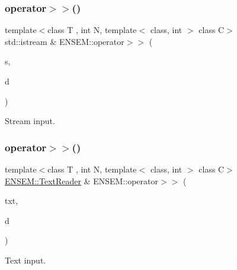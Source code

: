 \subsubsection{\texorpdfstring{operator$>$$>$()}{operator>>()}\hspace{0.1cm}{\footnotesize\ttfamily [1/2]}}
{\footnotesize\ttfamily template$<$class T , int N, template$<$ class, int $>$ class C$>$ \\
std\+::istream \& E\+N\+S\+E\+M\+::operator$>$$>$ (\begin{DoxyParamCaption}\item[{std\+::istream \&}]{s,  }\item[{\mbox{\hyperlink{classENSEM_1_1PVector}{P\+Vector}}$<$ T, \mbox{\hyperlink{operator__name__util_8cc_a7722c8ecbb62d99aee7ce68b1752f337}{N}}, C $>$ \&}]{d }\end{DoxyParamCaption})\hspace{0.3cm}{\ttfamily [inline]}}



Stream input. 

\mbox{\label{group__primvector_gae8999766af04f54e1142ab8717a7f742}} 
\subsubsection{\texorpdfstring{operator$>$$>$()}{operator>>()}\hspace{0.1cm}{\footnotesize\ttfamily [2/2]}}
{\footnotesize\ttfamily template$<$class T , int N, template$<$ class, int $>$ class C$>$ \\
\mbox{\hyperlink{classENSEM_1_1TextReader}{E\+N\+S\+E\+M\+::\+Text\+Reader}} \& E\+N\+S\+E\+M\+::operator$>$$>$ (\begin{DoxyParamCaption}\item[{\mbox{\hyperlink{classENSEM_1_1TextReader}{E\+N\+S\+E\+M\+::\+Text\+Reader}} \&}]{txt,  }\item[{\mbox{\hyperlink{classENSEM_1_1PVector}{P\+Vector}}$<$ T, \mbox{\hyperlink{operator__name__util_8cc_a7722c8ecbb62d99aee7ce68b1752f337}{N}}, C $>$ \&}]{d }\end{DoxyParamCaption})\hspace{0.3cm}{\ttfamily [inline]}}



Text input. 

